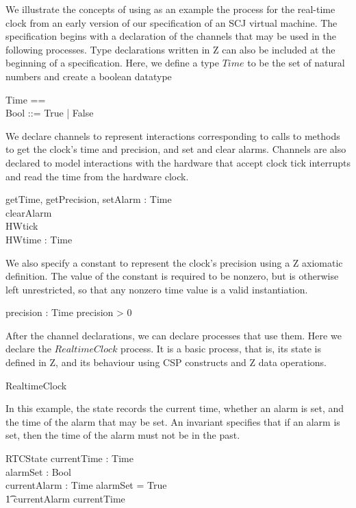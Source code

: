 We illustrate the concepts of \Circus{} using as an example the
process for the real-time clock from an early version of our
specification of an SCJ virtual machine.
The specification begins with a declaration of the channels that may
be used in the following processes.
Type declarations written in Z can also be included at the beginning
of a \Circus{} specification.
Here, we define a type $Time$ to be the set of natural numbers and
create a boolean datatype
%
\begin{zed}
  Time == \nat \\
  Bool ::= True | False
\end{zed}
%
We declare channels to represent interactions corresponding to calls
to methods to get the clock's time and precision, and set and clear
alarms.
Channels are also declared to model interactions with the hardware
that accept clock tick interrupts and read the time from the hardware
clock.
%
\begin{circus}
  \circchannel getTime, getPrecision, setAlarm : Time \\
  \circchannel clearAlarm \\
  \circchannel HWtick \\
  \circchannel HWtime : Time
\end{circus}
%
We also specify a constant to represent the clock's precision using a
Z axiomatic definition.
The value of the constant is required to be nonzero, but is otherwise
left unrestricted, so that any nonzero time value is a valid
instantiation.
%
\begin{axdef}
  precision : Time \where precision > 0
\end{axdef}
%
After the channel declarations, we can declare processes that use
them.
Here we declare the $RealtimeClock$ process.
It is a basic process, that is, its state is defined in Z, and its
behaviour using CSP constructs and Z data operations.
%
\begin{circus}
  \circprocess RealtimeClock \circdef \circbegin
\end{circus}
%
In this example, the state records the current time, whether an alarm
is set, and the time of the alarm that may be set.
An invariant specifies that if an alarm is set, then the time of the
alarm must not be in the past.
%
\begin{schema}{RTCState}
  currentTime  : Time \\
  alarmSet     : Bool \\
  currentAlarm : Time
\where
  alarmSet = True \implies \\
  \t1 currentAlarm \geq currentTime
\end{schema}
